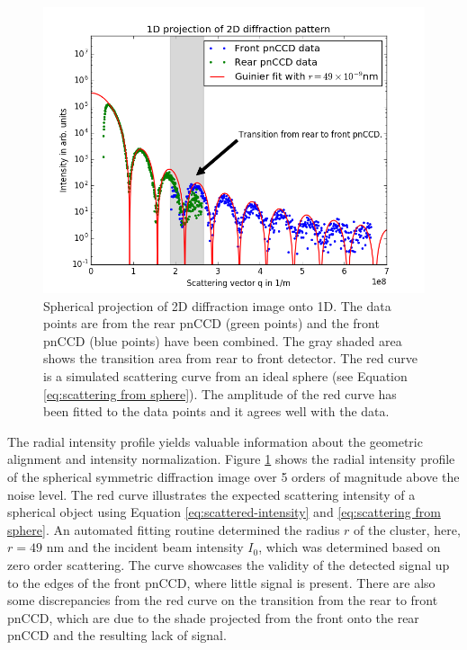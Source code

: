 \begin{figure}
	\centering
		\includegraphics[height=0.50\textwidth]{images/pnCCD-1d-sum.png}
	\caption[Spherical projection of 2D diffraction image onto 1D.]{Spherical projection of 2D diffraction image onto 1D. The data points are from the rear pnCCD (green points) and the front pnCCD (blue points) have been combined. The gray shaded area shows the transition area from rear to front detector. The red curve is a simulated scattering curve from an ideal sphere (see Equation \eqref{eq:scattering from sphere}). The amplitude of the red curve has been fitted to the data points and it agrees well with the data.}
	\label{fig:pnCCD-1d-sum}
\end{figure}
The radial intensity profile yields valuable information about the geometric alignment and intensity normalization. Figure \ref{fig:pnCCD-1d-sum} shows the radial intensity profile of the spherical symmetric diffraction image over 5 orders of magnitude above the noise level. The red curve illustrates the expected scattering intensity of a spherical object using Equation \eqref{eq:scattered-intensity} and \eqref{eq:scattering from sphere}. An automated fitting routine determined the radius $r$ of the cluster, here, $r=49$ nm and the incident beam intensity $I_{0}$, which was determined based on zero order scattering. The curve showcases the validity of the detected signal up to the edges of the front pnCCD, where little signal is present. There are also some discrepancies from the red curve on the transition from the rear to front pnCCD, which are due to the shade projected from the front onto the rear pnCCD and the resulting lack of signal.
%
%
%
